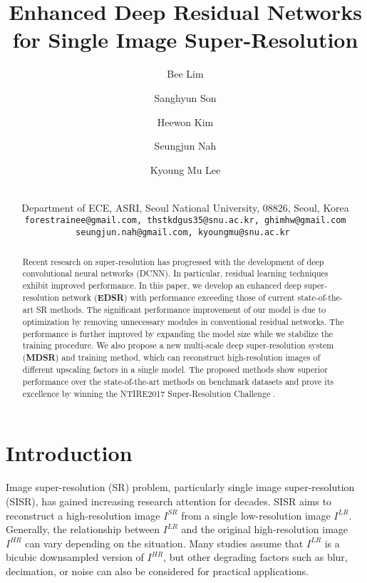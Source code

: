 \documentclass[10pt,twocolumn,letterpaper]{article}
\begin{document}
	\title{Enhanced Deep Residual Networks for Single Image Super-Resolution}
	
	\author{
		Bee Lim \and Sanghyun Son \and Heewon Kim \and Seungjun Nah \and Kyoung Mu Lee \and\\
		Department of ECE, ASRI, Seoul National University, 08826, Seoul, Korea\\
		\tt\small forestrainee@gmail.com, thstkdgus35@snu.ac.kr, ghimhw@gmail.com\\
		\tt\small seungjun.nah@gmail.com, kyoungmu@snu.ac.kr
	}
	
	\maketitle


	\begin{abstract}
		
		Recent research on super-resolution has progressed with the development of deep convolutional neural networks (DCNN). 
		In particular, residual learning techniques exhibit improved performance. 
		In this paper, we develop an enhanced deep super-resolution network (\textbf{EDSR}) with performance exceeding those of current state-of-the-art SR methods. 
		The significant performance improvement of our model is due to optimization by removing unnecessary modules in conventional residual networks. 
		The performance is further improved by expanding the model size while we stabilize the training procedure.
		We also propose a new multi-scale deep super-resolution system (\textbf{MDSR}) and training method, which can reconstruct high-resolution images of different upscaling factors in a single model. 
		The proposed methods show superior performance over the state-of-the-art methods on benchmark datasets and prove its excellence by winning the NTIRE2017 Super-Resolution Challenge \cite{Timofte_2017_CVPR_Workshops}. 

	\end{abstract}
	
	
	\section{Introduction}
	
	Image super-resolution (SR) problem, particularly single image super-resolution (SISR), has gained increasing research attention for decades.
	SISR aims to reconstruct a high-resolution image $I^{SR}$ from a single low-resolution image $I^{LR}$. 
	Generally, the relationship between $I^{LR}$ and the original high-resolution image $I^{HR}$ can vary depending on the situation. 
	Many studies assume that $I^{LR}$ is a bicubic downsampled version of $I^{HR}$, but other degrading factors such as blur, decimation, or noise can also be considered for practical applications.
	
\end{document}
